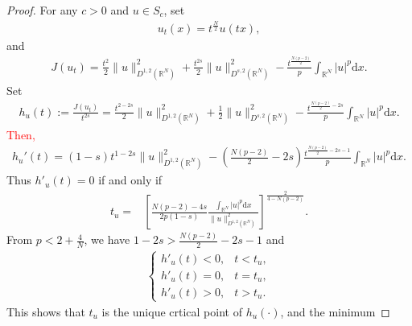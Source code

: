 \documentclass[12pt,a4paper,reqno]{amsart}
\numberwithin{equation}{section}
\begin{document}
\begin{proof}
For any $c>0$ and $u\in S_{c}$, set
\begin{equation*}
\begin{aligned}
u_{t}(x)=t^{\frac{N}{2}}u(tx),
\end{aligned}
\end{equation*}
and
\begin{equation*}
\begin{aligned}
J(u_{t})
=\frac{t^{2}}{2}\|u\|_{D^{1,2}(\mathbb{R}^{N})}^{2}
+\frac{t^{2s}}{2}\|u\|_{D^{s,2}(\mathbb{R}^{N})}^{2}
-\frac{t^{\frac{N(p-2)}{2}}}{p}
\int_{\mathbb{R}^{N}}
|u|^{p}
\mathrm{d}x.
\end{aligned}
\end{equation*}
Set
\begin{equation*}
\begin{aligned}
h_{u}(t):=
\frac{J(u_{t})}{t^{2s}}
=\frac{t^{2-2s}}{2}\|u\|_{D^{1,2}(\mathbb{R}^{N})}^{2}
+\frac{1}{2}\|u\|_{D^{s,2}(\mathbb{R}^{N})}^{2}
-\frac{t^{\frac{N(p-2)}{2}-2s}}{p}
\int_{\mathbb{R}^{N}}
|u|^{p}
\mathrm{d}x.
\end{aligned}
\end{equation*}
\textcolor{red}{Then,}
\begin{equation*}
\begin{aligned}
h_{u}'(t)
=(1-s)t^{1-2s}\|u\|_{D^{1,2}(\mathbb{R}^{N})}^{2}
-(\frac{N(p-2)}{2}-2s)\frac{t^{\frac{N(p-2)}{2}-2s-1}}{p}
\int_{\mathbb{R}^{N}}
|u|^{p}
\mathrm{d}x.
\end{aligned}
\end{equation*}
Thus $h'_{u}(t)=0$ if and only if
\begin{equation*}
\begin{aligned}
t_{u}
=&
\left[\frac{N(p-2)-4s}{2p(1-s)}
\frac{\int_{\mathbb{R}^{N}}
|u|^{p}
\mathrm{d}x}{\|u\|_{D^{1,2}(\mathbb{R}^{N})}^{2}}\right]^{\frac{2}{4-N(p-2)}}.
\end{aligned}
\end{equation*}
From $p<2+\frac{4}{N}$, we have
$1-2s>\frac{N(p-2)}{2}-2s-1$ and
\begin{equation*}
\begin{aligned}
\begin{cases}
h'_{u}(t)<0,&t<t_{u},\\
h'_{u}(t)=0,&t=t_{u},\\
h'_{u}(t)>0,&t>t_{u}.
\end{cases}
\end{aligned}
\end{equation*}
This shows that $t_{u}$ is the unique crtical point of $h_{u}(\cdot)$, and the minimum

\end{proof}
\end{document}
